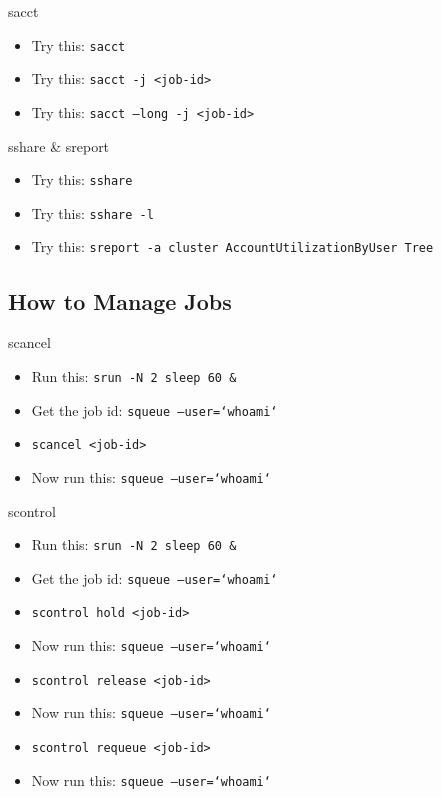 \documentclass[10pt,compress]{beamer}
\begin{document}
\begin{frame}{sacct}
\begin{itemize} \setlength{\itemsep}{1.5em}%
  \pause
  \item  Try this: \texttt{sacct}
  \pause
  \item  Try this: \texttt{sacct -j <job-id>}
  \pause
  \item  Try this: \texttt{sacct  --long  -j <job-id>}
\end{itemize}
\end{frame}

\begin{frame}{sshare \& sreport}
\begin{itemize} \setlength{\itemsep}{1.5em}%
  \pause
  \item  Try this: \texttt{sshare}
  \pause
  \item  Try this: \texttt{sshare -l}
   \pause
  \item  Try this: \texttt{sreport -a cluster AccountUtilizationByUser Tree}
\end{itemize}
\end{frame}



\subsection{How to Manage Jobs}

\begin{frame}{scancel}
\begin{itemize} \setlength{\itemsep}{1.5em}%
  \pause
  \item  Run this: \texttt{srun -N 2 sleep 60 \&}
  \pause
  \item  Get the job id: \texttt{squeue --user=`whoami`}
  \pause
  \item  \texttt{scancel <job-id>}
  \pause
  \item  Now run this: \texttt{squeue --user=`whoami`}
\end{itemize}
\end{frame}

\begin{frame}{scontrol}
\begin{itemize} \setlength{\itemsep}{1.5em}%
  \pause
  \item  Run this: \texttt{srun -N 2 sleep 60 \&}
  \pause
  \item  Get the job id: \texttt{squeue --user=`whoami`}
  \pause
  \item  \texttt{scontrol hold <job-id>}
  \pause
  \item  Now run this: \texttt{squeue --user=`whoami`}
   \pause
  \item  \texttt{scontrol release <job-id>}
  \pause
  \item  Now run this: \texttt{squeue --user=`whoami`}
  \pause
  \item  \texttt{scontrol requeue <job-id>}
  \pause
  \item  Now run this: \texttt{squeue --user=`whoami`}
\end{itemize}
\end{frame}
\end{document}
